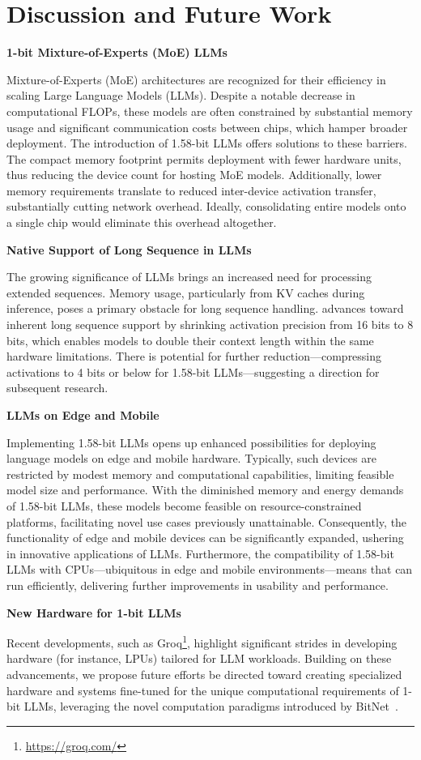 \section{Discussion and Future Work}

\textbf{1-bit Mixture-of-Experts (MoE) LLMs}

Mixture-of-Experts (MoE) architectures are recognized for their efficiency in scaling Large Language Models (LLMs). Despite a notable decrease in computational FLOPs, these models are often constrained by substantial memory usage and significant communication costs between chips, which hamper broader deployment. The introduction of 1.58-bit LLMs offers solutions to these barriers. The compact memory footprint permits deployment with fewer hardware units, thus reducing the device count for hosting MoE models. Additionally, lower memory requirements translate to reduced inter-device activation transfer, substantially cutting network overhead. Ideally, consolidating entire models onto a single chip would eliminate this overhead altogether.

\textbf{Native Support of Long Sequence in LLMs}

The growing significance of LLMs brings an increased need for processing extended sequences. Memory usage, particularly from KV caches during inference, poses a primary obstacle for long sequence handling.  advances toward inherent long sequence support by shrinking activation precision from 16 bits to 8 bits, which enables models to double their context length within the same hardware limitations. There is potential for further reduction—compressing activations to 4 bits or below for 1.58-bit LLMs—suggesting a direction for subsequent research.

\textbf{LLMs on Edge and Mobile}

Implementing 1.58-bit LLMs opens up enhanced possibilities for deploying language models on edge and mobile hardware. Typically, such devices are restricted by modest memory and computational capabilities, limiting feasible model size and performance. With the diminished memory and energy demands of 1.58-bit LLMs, these models become feasible on resource-constrained platforms, facilitating novel use cases previously unattainable. Consequently, the functionality of edge and mobile devices can be significantly expanded, ushering in innovative applications of LLMs. Furthermore, the compatibility of 1.58-bit LLMs with CPUs—ubiquitous in edge and mobile environments—means that  can run efficiently, delivering further improvements in usability and performance.

\textbf{New Hardware for 1-bit LLMs}

Recent developments, such as Groq\footnote{\url{https://groq.com/}}, highlight significant strides in developing hardware (for instance, LPUs) tailored for LLM workloads. Building on these advancements, we propose future efforts be directed toward creating specialized hardware and systems fine-tuned for the unique computational requirements of 1-bit LLMs, leveraging the novel computation paradigms introduced by BitNet~\cite{bitnet}.

